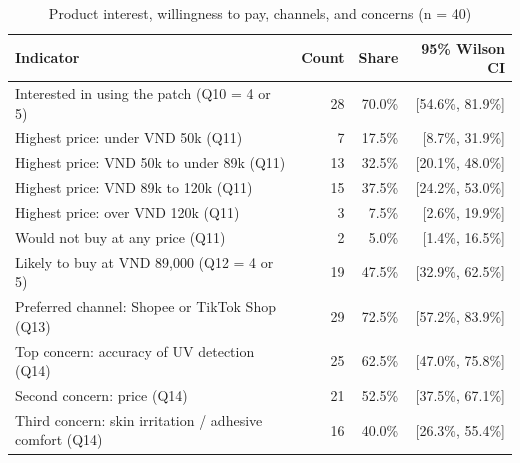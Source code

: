 \begin{table}[ht]\centering\small\caption{Product interest, willingness to pay, channels, and concerns (n = 40)}\label{tab:svy-product}
\begin{tabular}{@{}L{6.2cm}rrr@{}}\toprule
\textbf{Indicator} & \textbf{Count} & \textbf{Share} & \textbf{95\% Wilson CI}\\\midrule
Interested in using the patch (Q10 = 4 or 5) & 28 & 70.0\% & [54.6\%, 81.9\%]\\
Highest price: under VND 50k (Q11) & 7 & 17.5\% & [8.7\%, 31.9\%]\\
Highest price: VND 50k to under 89k (Q11) & 13 & 32.5\% & [20.1\%, 48.0\%]\\
Highest price: VND 89k to 120k (Q11) & 15 & 37.5\% & [24.2\%, 53.0\%]\\
Highest price: over VND 120k (Q11) & 3 & 7.5\% & [2.6\%, 19.9\%]\\
Would not buy at any price (Q11) & 2 & 5.0\% & [1.4\%, 16.5\%]\\
Likely to buy at VND 89,000 (Q12 = 4 or 5) & 19 & 47.5\% & [32.9\%, 62.5\%]\\
Preferred channel: Shopee or TikTok Shop (Q13) & 29 & 72.5\% & [57.2\%, 83.9\%]\\
Top concern: accuracy of UV detection (Q14) & 25 & 62.5\% & [47.0\%, 75.8\%]\\
Second concern: price (Q14) & 21 & 52.5\% & [37.5\%, 67.1\%]\\
Third concern: skin irritation / adhesive comfort (Q14) & 16 & 40.0\% & [26.3\%, 55.4\%]\\
\bottomrule\end{tabular}\end{table}

